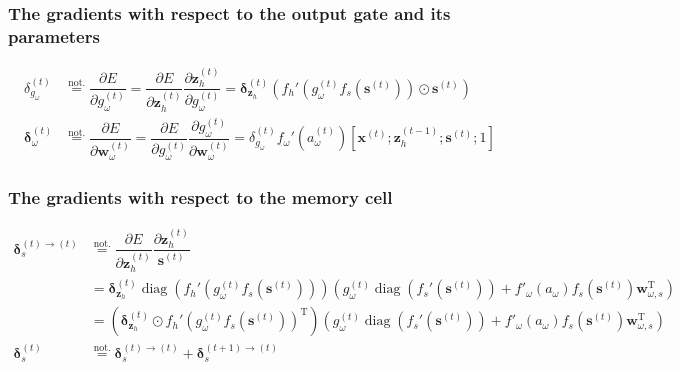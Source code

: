 \documentclass[11pt]{article}
\DeclareMathOperator{\diag}{diag}
\begin{document}
\subsubsection*{The gradients with respect to the output gate and its parameters}

\begin{align}
  \delta_{g_{\omega}}^{(t)} &\overset{\text{not.}}{=} \dfrac{\partial E}{\partial g_{\omega}^{(t)}} = \dfrac{\partial E}{\partial \mathbf{z}_{h}^{(t)}} \dfrac{\partial \mathbf{z}_h^{(t)}}{\partial g_{\omega}^{(t)}} = \boldsymbol{\delta}_{\mathbf{z}_h}^{(t)}\left(f_h'\left(g_{\omega}^{(t)}f_s\left(\mathbf{s}^{(t)}\right)\right)\odot\mathbf{s}^{(t)}\right) \\
  \boldsymbol{\delta}_{\omega}^{(t)} &\overset{\text{not.}}{=} \dfrac{\partial E}{\partial \mathbf{w}_{\omega}^{(t)}} = \dfrac{\partial E}{\partial g_{\omega}^{(t)}} \dfrac{\partial g_{\omega}^{(t)}}{\partial \mathbf{w}_{\omega}^{(t)}} = \delta_{g_{\omega}}^{(t)} f_{\omega}'\left(a_{\omega}^{(t)}\right) \left[\mathbf{x}^{(t)}; \mathbf{z}_{h}^{(t-1)}; \mathbf{s}^{(t)}; 1\right]
\end{align}

\subsubsection*{The gradients with respect to the memory cell}

\begin{align}
  \boldsymbol{\delta}_s^{(t)\rightarrow(t)}
  & \overset{\text{not.}}{=}
    \dfrac{\partial E}{\partial \mathbf{z}_h^{(t)}}
    \dfrac{\partial \mathbf{z}_h^{(t)}}{\mathbf{s}^{(t)}}  \\
  & = \boldsymbol{\delta}_{\mathbf{z}_h}^{(t)}
    \diag\left(f_{h}'\left(g_{\omega}^{(t)} f_s\left(\mathbf{s}^{(t)}\right)\right)\right)
    \left( g_{\omega}^{(t)} \diag\left(f_s'\left(\mathbf{s}^{(t)}\right) \right) + f'_{\omega}\left(a_{\omega} \right) f_s\left(\mathbf{s}^{(t)}\right)\mathbf{w}^{\text{T}}_{\omega, s} \right) \\
  & = \left(\boldsymbol{\delta}_{\mathbf{z}_h}^{(t)} \odot
    {f_{h}'\left(g_{\omega}^{(t)} f_s\left(\mathbf{s}^{(t)}\right)\right)}^{\text{T}}\right)
    \left( g_{\omega}^{(t)} \diag\left(f_s'\left(\mathbf{s}^{(t)}\right) \right) + f'_{\omega}\left(a_{\omega} \right) f_s\left(\mathbf{s}^{(t)}\right)\mathbf{w}^{\text{T}}_{\omega, s} \right)\\
  \boldsymbol{\delta}_s^{(t)} &\overset{\text{not.}}{=} \boldsymbol{\delta}^{(t) \rightarrow (t)}_s + \boldsymbol{\delta}^{(t+1) \rightarrow (t)}_s
\end{align}
\end{document}
